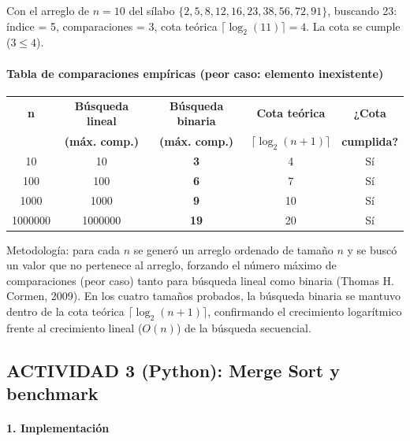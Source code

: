 \documentclass[12pt,a4paper]{article}
\begin{document}
Con el arreglo de $n=10$ del sílabo $\{2,5,8,12,16,23,38,56,72,91\}$, buscando 23:
índice = 5, comparaciones = 3, cota teórica $\lceil \log_2(11) \rceil = 4$. La cota se
cumple ($3 \leq 4$).

\paragraph{Tabla de comparaciones empíricas (peor caso: elemento inexistente)}\mbox{}

\begin{center}
\begin{tabular}{|c|c|c|c|c|}
\hline
\textbf{n} & \textbf{Búsqueda lineal} & \textbf{Búsqueda binaria} & \textbf{Cota teórica} & \textbf{¿Cota} \\
 & \textbf{(máx. comp.)} & \textbf{(máx. comp.)} & $\lceil \log_2(n+1) \rceil$ & \textbf{cumplida?} \\
\hline
10 & 10 & \textbf{3} & 4 & Sí \\
\hline
100 & 100 & \textbf{6} & 7 & Sí \\
\hline
1000 & 1000 & \textbf{9} & 10 & Sí \\
\hline
1000000 & 1000000 & \textbf{19} & 20 & Sí \\
\hline
\end{tabular}
\end{center}

\vspace{6pt}
Metodología: para cada $n$ se generó un arreglo ordenado de tamaño $n$ y se buscó un valor
que no pertenece al arreglo, forzando el número máximo de comparaciones (peor caso) tanto
para búsqueda lineal como binaria (Thomas H. Cormen, 2009). En los cuatro tamaños probados,
la búsqueda binaria se mantuvo dentro de la cota teórica $\lceil \log_2(n+1) \rceil$,
confirmando el crecimiento logarítmico frente al crecimiento lineal ($O(n)$) de la búsqueda
secuencial.

\newpage
\subsection*{ACTIVIDAD 3 (Python): Merge Sort y benchmark}

\paragraph{1. Implementación}\mbox{}
\end{document}
